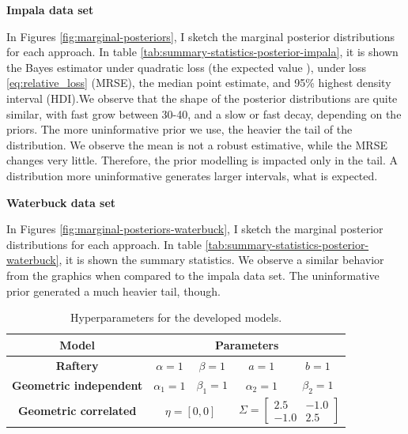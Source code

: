 {{    {\bf Impala data set}

    \vspace{2ex}

    \ind In Figures \ref{fig:marginal-posteriors}, I sketch the marginal posterior
    distributions for each approach. In table \ref{tab:summary-statistics-posterior-impala}, it is
    shown the Bayes estimator under quadratic loss (the expected value
    \cite[Section 4]{Robert2007}), under loss \ref{eq:relative_loss} (MRSE),
    the median point estimate, and 95\%
    highest density interval (HDI).We observe that the shape of
    the posterior distributions are quite similar, with fast grow between
    30-40, and a slow or fast decay, depending on the priors. The more
    uninformative prior we use, the heavier the tail of the distribution. We
    observe the mean is not a robust estimative, while the MRSE changes very
    little. Therefore, the prior modelling is impacted only in the tail. A
    distribution more uninformative generates larger intervals, what is
    expected. 

    \vspace{2ex}

    {\bf Waterbuck data set}

    \vspace{2ex}

    \ind In Figures \ref{fig:marginal-posteriors-waterbuck}, I sketch the marginal posterior
    distributions for each approach. In table \ref{tab:summary-statistics-posterior-waterbuck}, it is
    shown the summary statistics. We observe a similar behavior from the
    graphics when compared to the impala data set. The
    uninformative prior generated a much heavier tail, though. 

    \vspace{2ex}
}
}

\begin{table}[!ht]
    \centering
    \begin{tabular}{ccccc}
    \hline
    \textbf{Model}                 & \multicolumn{4}{c}{\textbf{Parameters}}                                                                           \\ \hline
    \textbf{Raftery}               & $\alpha = 1$       & $\beta =1 $      & $a = 1$                                & $b = 1$                              \\
    \textbf{Geometric independent} & $\alpha_1 = 1$     & $\beta_1 = 1$    & $\alpha_2 = 1$                         & $\beta_2 = 1$                        \\
    \textbf{Geometric correlated}  & \multicolumn{2}{c}{$\eta = [0, 0]$} & \multicolumn{2}{c}{$\Sigma = \begin{bmatrix} 2.5 & -1.0 \\ -1.0 & 2.5 \end{bmatrix}$} \\ \hline
    \end{tabular}
    \caption{Hyperparameters for the developed models.}
    \label{tab:hyperparameters-models}
\end{table}

